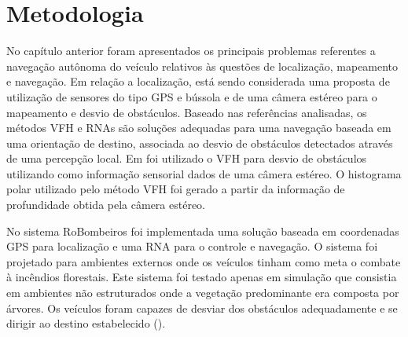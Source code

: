 \chapter{Metodologia} 
\label{cap:metodologia}


No capítulo anterior foram apresentados os principais problemas referentes a
navegação autônoma do veículo relativos às questões de localização, mapeamento e
navegação. Em relação a localização, está sendo considerada uma proposta de
utilização de sensores do tipo GPS e bússola e de uma câmera estéreo para o
mapeamento e desvio de obstáculos. Baseado nas referências analisadas, os
métodos VFH e RNAs são soluções adequadas para uma navegação baseada em uma
orientação de destino, associada ao desvio de obstáculos detectados através de
uma percepção local. Em \cite{caio} foi utilizado o VFH para desvio de
obstáculos utilizando como informação sensorial dados de uma câmera estéreo. O
histograma polar utilizado pelo método VFH foi gerado a partir da informação de
profundidade obtida pela câmera estéreo. 





No sistema RoBombeiros \cite{Pessin2008} foi implementada uma solução baseada em
coordenadas GPS para localização e uma RNA para o controle e navegação. O
sistema foi projetado para ambientes externos onde os veículos tinham como meta
o combate à incêndios florestais. Este sistema foi testado apenas em simulação
que consistia em ambientes não estruturados onde a vegetação predominante
era composta por árvores. Os veículos foram capazes de desviar dos obstáculos
adequadamente e se dirigir ao destino estabelecido (). 


